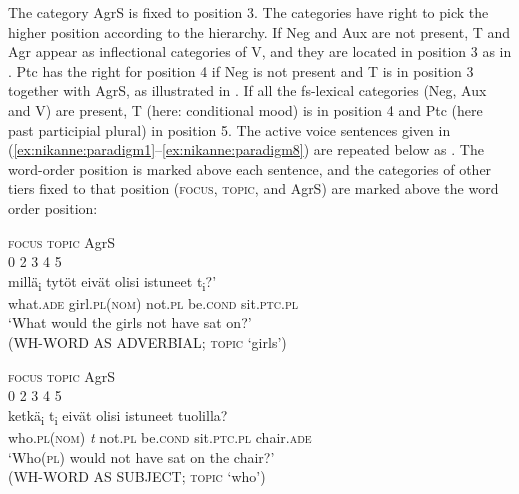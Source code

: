 \documentclass[output=paper]{langsci/langscibook}
\begin{document}
The  category AgrS is fixed to position 3. The  categories have right to pick the higher position according to the  hierarchy.  If Neg and Aux are not present, T and Agr appear as inflectional categories of V, and they are located in position 3 as in . Ptc has the right for position 4 if Neg is not present and T is in position 3 together with AgrS, as illustrated in . If all the fs-lexical categories (Neg, Aux and V) are present, T (here: conditional mood) is in position 4 and Ptc (here past participial plural) in position 5. The active voice sentences given in (\ref{ex:nikanne:paradigm1}--\ref{ex:nikanne:paradigm8}) are repeated below as . The word-order position is marked above each sentence, and the categories of other tiers fixed to that position (\textsc{focus}, \textsc{topic}, and AgrS) are marked above the word order position:



\ea\label{ex:nikanne:26} 
  \ea\label{ex:nikanne:26a}
  \gllll \textsc{focus}           \textsc{topic}              AgrS\\
  0    2   3         4  5\\
    millä\textsubscript{i}               tytöt   eivät              olisi   istuneet                   t\textsubscript{i}?’\\
  what.\textsc{ade}   girl.\textsc{pl}(\textsc{nom}) not.\textsc{pl}         be.\textsc{cond}    sit.\textsc{ptc}.\textsc{pl}\\
  \glt  ‘What would the girls not have sat on?’ \\
  (WH-WORD AS ADVERBIAL; \textsc{topic} ‘girls’)
  
  \ex\label{ex:nikanne:26b}
  \gllll \textsc{focus}           \textsc{topic}              AgrS\\
    0     2   3                     4  5\\
    ketkä\textsubscript{i}     t\textsubscript{i}   eivät   olisi   istuneet   tuolilla?\\
    who.\textsc{pl}(\textsc{nom}) \textit{t}   not.\textsc{pl}   be.\textsc{cond}   sit.\textsc{ptc}.\textsc{pl}    chair.\textsc{ade}\\
  \glt   ‘Who(\textsc{pl}) would not have sat on the chair?’ \\
  (WH-WORD AS SUBJECT; \textsc{topic} ‘who’)
  
\end{document}
